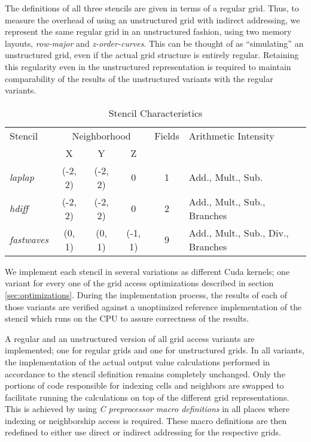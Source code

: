 The definitions of all three stencils are given in terms of a regular grid. Thus, to measure the overhead of using an unstructured grid with indirect addressing, we represent the same regular grid in an unstructured fashion, using two memory layouts, \emph{row-major} and \emph{z-order-curves}. This can be thought of as ``simulating'' an unstructured grid, even if the actual grid structure is entirely regular. Retaining this regularity even in the unstructured representation is required to maintain comparability of the results of the unstructured variants with the regular variants.

\begin{table}											
\begin{tabular}{l c c c c p{4cm}}
	\hline
	Stencil  &  \multicolumn{3}{c}{Neighborhood}  &  Fields  &  Arithmetic Intensity \\
	\cline{2-4}
	&  X  &  Y  &  Z  & \\
	\hline
	\emph{laplap}  &  (-2, 2)  &  (-2, 2)  &  0  &  1  &  Add., Mult., Sub. \\
	\emph{hdiff}  &  (-2, 2)  &  (-2, 2)  &  0  &  2  &  Add., Mult., Sub., Branches \\
	\emph{fastwaves}  &  (0, 1)  &  (0, 1)  &  (-1, 1)  &  9  & Add., Mult., Sub., Div., Branches \\
	\hline
\end{tabular}
\caption{\label{tab:benchmarked-stencils}Stencil Characteristics}
\end{table}

We implement each stencil in several variations as different Cuda kernels; one variant for every one of the grid access optimizations described in section \ref{sec:optimizations}. During the implementation process, the results of each of those variants are verified against a unoptimized reference implementation of the stencil which runs on the CPU to assure correctness of the results.

A regular and an unstructured version of all grid access variants are implemented; one for regular grids and one for unstructured grids. In all variants, the implementation of the actual output value calculations performed in accordance to the stencil definition remains completely unchanged. Only the portions of code responsible for indexing cells and neighbors are swapped to facilitate running the calculations on top of the different grid representations. This is achieved by using \emph{C preprocessor macro definitions} in all places where indexing or neighborship access is required. These macro definitions are then redefined to either use direct or indirect addressing for the respective grids.


